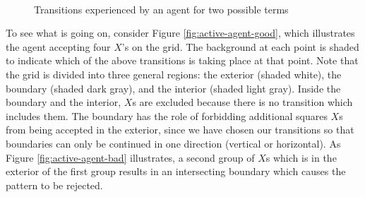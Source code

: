 \documentclass[12pt]{amsbook}
\theoremstyle{plain}
\theoremstyle{definition}
\theoremstyle{remark}
\begin{document}
\begin{figure}
\\
\caption{Transitions experienced by an agent for two possible terms}
\end{figure}

To see what is going on, consider Figure \ref{fig:active-agent-good}, which illustrates the agent accepting four $X$'s on the grid.  The background at each point is shaded to indicate which of the above transitions is taking place at that point.  Note that the grid is divided into three general regions:  the exterior (shaded white), the boundary (shaded dark gray), and the interior (shaded light gray).  Inside the boundary and the interior, $X$s are excluded because there is no transition which includes them.  The boundary has the role of forbidding additional squares $X$s from being accepted in the exterior, since we have chosen our transitions so that boundaries can only be continued in one direction (vertical or horizontal).  As Figure \ref{fig:active-agent-bad} illustrates, a second group of $X$s which is in the exterior of the first group results in an intersecting boundary which causes the pattern to be rejected.
\end{document}
